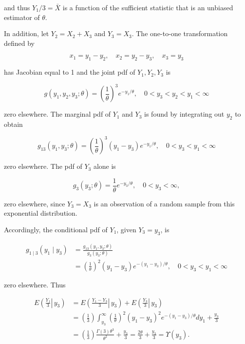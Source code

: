 and thus $Y_{1} / 3=\bar{X}$ is a function of the sufficient statistic that is an unbiased estimator of $\theta$.

In addition, let $Y_{2}=X_{2}+X_{3}$ and $Y_{3}=X_{3}$. The one-to-one transformation defined by

$$
x_{1}=y_{1}-y_{2}, \quad x_{2}=y_{2}-y_{3}, \quad x_{3}=y_{3}
$$

has Jacobian equal to 1 and the joint pdf of $Y_{1}, Y_{2}, Y_{3}$ is

$$
g\left(y_{1}, y_{2}, y_{3} ; \theta\right)=\left(\frac{1}{\theta}\right)^{3} e^{-y_{1} / \theta}, \quad 0<y_{3}<y_{2}<y_{1}<\infty
$$

zero elsewhere. The marginal pdf of $Y_{1}$ and $Y_{3}$ is found by integrating out $y_{2}$ to obtain

$$
g_{13}\left(y_{1}, y_{3} ; \theta\right)=\left(\frac{1}{\theta}\right)^{3}\left(y_{1}-y_{3}\right) e^{-y_{1} / \theta}, \quad 0<y_{3}<y_{1}<\infty
$$

zero elsewhere. The pdf of $Y_{3}$ alone is

$$
g_{3}\left(y_{3} ; \theta\right)=\frac{1}{\theta} e^{-y_{3} / \theta}, \quad 0<y_{3}<\infty,
$$

zero elsewhere, since $Y_{3}=X_{3}$ is an observation of a random sample from this exponential distribution.

Accordingly, the conditional pdf of $Y_{1}$, given $Y_{3}=y_{3}$, is

$$
\begin{aligned}
g_{1 \mid 3}\left(y_{1} \mid y_{3}\right) & =\frac{g_{13}\left(y_{1}, y_{3} ; \theta\right)}{g_{3}\left(y_{3} ; \theta\right)} \\
& =\left(\frac{1}{\theta}\right)^{2}\left(y_{1}-y_{3}\right) e^{-\left(y_{1}-y_{3}\right) / \theta}, \quad 0<y_{3}<y_{1}<\infty
\end{aligned}
$$

zero elsewhere. Thus

$$
\begin{aligned}
E\left(\left.\frac{Y_{1}}{3} \right\rvert\, y_{3}\right) & =E\left(\left.\frac{Y_{1}-Y_{3}}{3} \right\rvert\, y_{3}\right)+E\left(\left.\frac{Y_{3}}{3} \right\rvert\, y_{3}\right) \\
& =\left(\frac{1}{3}\right) \int_{y_{3}}^{\infty}\left(\frac{1}{\theta}\right)^{2}\left(y_{1}-y_{3}\right)^{2} e^{-\left(y_{1}-y_{3}\right) / \theta} d y_{1}+\frac{y_{3}}{3} \\
& =\left(\frac{1}{3}\right) \frac{\Gamma(3) \theta^{3}}{\theta^{2}}+\frac{y_{3}}{3}=\frac{2 \theta}{3}+\frac{y_{3}}{3}=\Upsilon\left(y_{3}\right) .
\end{aligned}
$$

